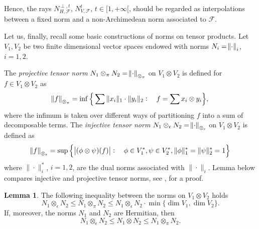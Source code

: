 \documentclass[12pt]{article}
\numberwithin{equation}{section}
\theoremstyle{theorem}
\theoremstyle{definition}
\newtheorem{lem}[thm]{Lemma}
\theoremstyle{remark}
\begin{document}
	Hence, the rays $N_{H, \mathcal{F}}^{\perp, t}$, $ N_{V, \mathcal{F}}^t$, $t \in [1, +\infty[$, should be regarded as interpolations between a fixed norm and a non-Archimedean norm associated to $\mathcal{F}$.
	\par 
	Let us, finally, recall some basic constructions of norms on tensor products.
	Let $V_1, V_2$ be two finite dimensional vector spaces endowed with norms $N_i = \norm{\cdot}_i$, $i = 1, 2$.
	\par 
	The \textit{projective tensor norm} $N_1 \otimes_{\pi} N_2 = \norm{\cdot}_{\otimes_{\pi}}$ on $V_1 \otimes V_2$ is defined for $f \in V_1 \otimes V_2$ as 
	\begin{equation}\label{eq_defn_proj_norm}
		\norm{f}_{ \otimes_{\pi} }
		=
		\inf
		\Big\{
			\sum \| x_i \|_1 \cdot  \| y_i \|_2
			:
			\quad
			f = \sum x_i \otimes y_i
		\Big\},
	\end{equation}
	where the infimum is taken over different ways of partitioning $f$ into a sum of decomposable terms.
	The \textit{injective tensor norm} $N_1 \otimes_{\epsilon} N_2 = \norm{\cdot}_{ \otimes_{\epsilon} }$ on $V_1 \otimes V_2$ is defined as 
	\begin{equation}\label{eq_defn_inf_norm}
		\norm{f}_{ \otimes_{\epsilon} }
		=
		\sup
		\Big\{
			\big|
				(\phi \otimes \psi)(f)
			\big|
			:
			\quad
			\phi \in V_1^*, \psi \in V_2^*, \| \phi \|_{1}^* = \| \psi \|_{2}^* = 1
		\Big\}
	\end{equation}
	where $\| \cdot \|_{i}^*$, $i = 1, 2$, are the dual norms associated with $\| \cdot \|_{i}$.
	Lemma below compares injective and projective tensor norms, see \cite[Proposition 6.1]{RyanTensProd}, \cite[Theorem 21]{SzarekComp} for a proof.
	\begin{lem}\label{lem_inj_proj_bnd_nntr}
		The following inequality between the norms on $V_1 \otimes V_2$ holds
		\begin{equation}\label{eq_bnd_proj_inf}
			 N_1 \otimes_{\epsilon} N_2
			 \leq
			 N_1 \otimes_{\pi} N_2
			 \leq
			 N_1 \otimes_{\epsilon} N_2
			 \cdot
			 \min \{ \dim V_1, \dim V_2 \}.
		\end{equation}
		If, moreover, the norms $N_1$ and $N_2$ are Hermitian, then
		\begin{equation}
			 N_1 \otimes_{\epsilon} N_2
			 \leq
			  N_1 \otimes N_2
			 \leq
			  N_1 \otimes_{\pi} N_2.
		\end{equation}
	\end{lem}
	
\end{document}
